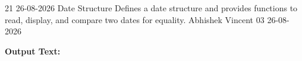 \clearpage
\label{prog:21}
\programhead
  {21}
  {26-08-2026}
  {Date Structure}
  {Defines a date structure and provides functions to read, display, and compare two dates for equality.}
  {Abhishek Vincent}
  {03}
  {26-08-2026}

\divider
\textbf{Output Text:}\par
\vspace{2pt}

